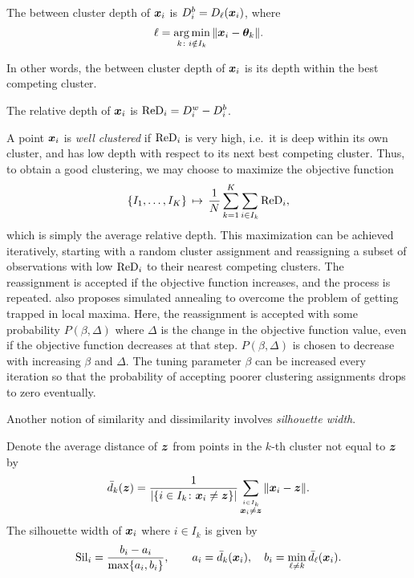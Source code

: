 \begin{definition}
    The between cluster depth of $\bm{x}_i$ is $D_i^b = D_\ell(\bm{x}_i)$, where
    \begin{equation}
        \ell = \operatorname*{arg\,min}_{k \colon i \notin I_k} \Vert \bm{x}_i - \bm{\theta}_k \Vert.
    \end{equation}
\end{definition}

In other words, the between cluster depth of $\bm{x}_i$ is its depth within the
best competing cluster.

\begin{definition}
    The relative depth of $\bm{x}_i$ is $\operatorname{ReD}_i = D_i^w - D_i^b$.
\end{definition}

A point $\bm{x}_i$ is \emph{well clustered} if $\operatorname{ReD}_i$ is very high, i.e.\ it is
deep within its own cluster, and has low depth with respect to its next best
competing cluster.
Thus, to obtain a good clustering, we may choose to maximize the objective
function
\begin{equation}
    \{I_1, \dots, I_K\} \,\mapsto\, \frac{1}{N} \sum_{k = 1}^K \sum_{i \in I_k} \operatorname{ReD}_i,
\end{equation}
which is simply the average relative depth.
This maximization can be achieved iteratively, starting with a random cluster
assignment and reassigning a subset of observations with low $\operatorname{ReD}_i$ to their
nearest competing clusters.
The reassignment is accepted if the objective function increases, and the
process is repeated.
\textcite{jornsten-2004} also proposes simulated annealing to overcome the
problem of getting trapped in local maxima.
Here, the reassignment is accepted with some probability $P(\beta, \Delta)$
where $\Delta$ is the change in the objective function value, even if the
objective function decreases at that step.
$P(\beta, \Delta)$ is chosen to decrease with increasing $\beta$ and $\Delta$.
The tuning parameter $\beta$ can be increased every iteration so that the
probability of accepting poorer clustering assignments drops to zero
eventually.

Another notion of similarity and dissimilarity involves \emph{silhouette
width}.

\begin{definition}
    Denote the average distance of $\bm{z}$ from points in the $k$-th cluster not
    equal to $\bm{z}$ by
    \begin{equation}
        \bar{d}_k(\bm{z}) = \frac{1}{|\{i \in I_k\colon \bm{x}_i \neq \bm{z}\}|} \sum_{\stackrel{i \in I_k}{\bm{x}_i \neq \bm{z}}} \Vert \bm{x}_i - \bm{z} \Vert.
    \end{equation}
    The silhouette width of $\bm{x}_i$ where $i \in I_k$ is given by
    \begin{equation}
        \operatorname{Sil}_i = \frac{b_i - a_i}{\max\{a_i, b_i\}}, \qquad
        a_i = \bar{d}_k(\bm{x}_i), \quad
        b_i = \min_{\ell \neq k} \bar{d}_\ell(\bm{x}_i).
    \end{equation}
\end{definition}


